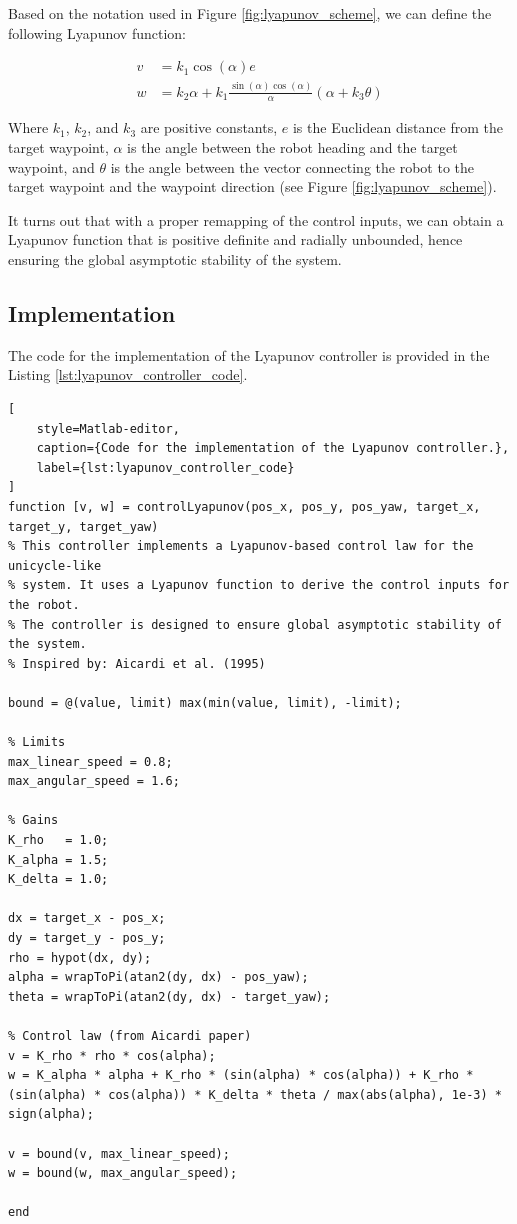 Based on the notation used in Figure \ref{fig:lyapunov_scheme}, we can define the following Lyapunov function:

\begin{align}
    v & = k_1 \cos(\alpha) e                                                                         \\
    w & = k_2 \alpha + k_1 \frac{\sin(\alpha) \cos(\alpha)}{\alpha} \left(\alpha + k_3 \theta\right)
    \label{eq:lyapunov_control_law}
\end{align}

Where $k_1$, $k_2$, and $k_3$ are positive constants, $e$ is the Euclidean distance from the target waypoint, $\alpha$ is the angle between the robot heading and the target waypoint, and $\theta$ is the angle between the vector connecting the robot to the target waypoint and the waypoint direction (see Figure \ref{fig:lyapunov_scheme}).

It turns out that with a proper remapping of the control inputs, we can obtain a Lyapunov function that is positive definite and radially unbounded, hence ensuring the global asymptotic stability of the system.



\subsection{Implementation}
\label{subsec:lyapunov_implementation}

The code for the implementation of the Lyapunov controller is provided in the Listing \ref{lst:lyapunov_controller_code}.

\begin{lstlisting}[
    style=Matlab-editor,
    caption={Code for the implementation of the Lyapunov controller.},
    label={lst:lyapunov_controller_code}
]
function [v, w] = controlLyapunov(pos_x, pos_y, pos_yaw, target_x, target_y, target_yaw)
% This controller implements a Lyapunov-based control law for the unicycle-like
% system. It uses a Lyapunov function to derive the control inputs for the robot.
% The controller is designed to ensure global asymptotic stability of the system.
% Inspired by: Aicardi et al. (1995)

bound = @(value, limit) max(min(value, limit), -limit);

% Limits
max_linear_speed = 0.8;
max_angular_speed = 1.6;

% Gains
K_rho   = 1.0;
K_alpha = 1.5;
K_delta = 1.0;

dx = target_x - pos_x;
dy = target_y - pos_y;
rho = hypot(dx, dy);
alpha = wrapToPi(atan2(dy, dx) - pos_yaw);
theta = wrapToPi(atan2(dy, dx) - target_yaw);

% Control law (from Aicardi paper)
v = K_rho * rho * cos(alpha);
w = K_alpha * alpha + K_rho * (sin(alpha) * cos(alpha)) + K_rho * (sin(alpha) * cos(alpha)) * K_delta * theta / max(abs(alpha), 1e-3) * sign(alpha);

v = bound(v, max_linear_speed);
w = bound(w, max_angular_speed);

end
\end{lstlisting}



